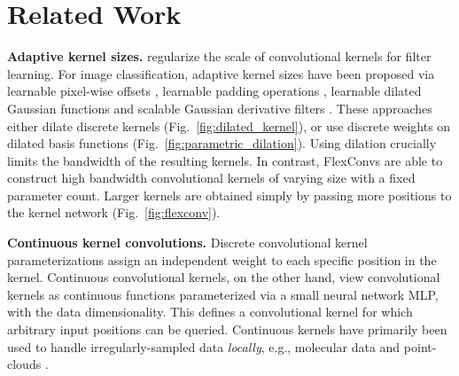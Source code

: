 \documentclass{article} \usepackage{iclr2022_conference,times}
\newcommand{\mlp}{{\btt MLP}}
\newcommand{\mlppsi}{\mlp}
\begin{document}
\section{Related Work}
\vspace{-2mm}
\textbf{Adaptive kernel sizes.} \citet{loog2017supervised} regularize the scale of convolutional kernels for filter learning. For image classification, adaptive kernel sizes have been proposed via learnable pixel-wise offsets \citep{dai2017deformable}, learnable padding operations \citep{Han_2018_CVPR}, learnable dilated Gaussian functions \citep{Shelhamer2019BlurringTL, Xiong_2020_CVPR, tabernik2020spatially, nguyen2020robust} and scalable Gaussian derivative filters \citep{pintea2021resolution, tomen2021deep, lindeberg2021scale}.
These approaches either dilate discrete kernels (Fig.~\ref{fig:dilated_kernel}), or use discrete weights on dilated basis functions (Fig.~\ref{fig:parametric_dilation}). Using dilation crucially limits the bandwidth of the resulting kernels. In contrast, FlexConvs are able to construct high bandwidth convolutional kernels of varying size with a fixed parameter count. 
Larger kernels are obtained simply by passing more positions to the kernel network (Fig.~\ref{fig:flexconv}). 

\textbf{Continuous kernel convolutions.} Discrete convolutional kernel parameterizations assign an independent weight to each specific position in the kernel. Continuous convolutional kernels, on the other hand, view convolutional kernels as continuous functions parameterized via a small neural network \mlppsi, with  the data dimensionality. This defines a convolutional kernel for which arbitrary input positions can be queried. Continuous kernels have primarily been used to handle irregularly-sampled data \textit{locally}, e.g., molecular data \citep{simonovsky2017dynamic, schutt2017schnet} and point-clouds \citep{thomas2018tensor, wang2018deep, shi2019points}. 
\end{document}
